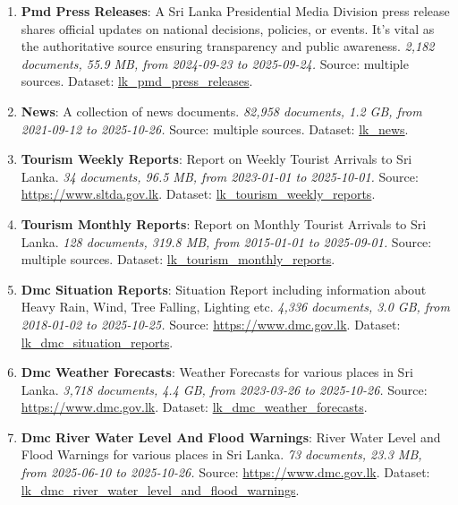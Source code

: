 \documentclass[10pt,a4paper]{article}%
\begin{document}
\begin{enumerate}
\item%
\textbf{Pmd Press Releases}: A Sri Lanka Presidential Media Division press release shares official updates on national decisions, policies, or events. It’s vital as the authoritative source ensuring transparency and public awareness.\textit{ 2,182 documents, 55.9 MB, from 2024{-}09{-}23 to 2025{-}09{-}24.} Source: multiple sources. Dataset: \href{https://github.com/nuuuwan/lk\_pmd/tree/data\_lk\_pmd\_press\_releases/data/lk\_pmd\_press\_releases}{lk\_pmd\_press\_releases}.%
\item%
\textbf{News}: A collection of news documents.\textit{ 82,958 documents, 1.2 GB, from 2021{-}09{-}12 to 2025{-}10{-}26.} Source: multiple sources. Dataset: \href{https://github.com/nuuuwan/lk\_news/tree/data/data/lk\_news}{lk\_news}.%
\item%
\textbf{Tourism Weekly Reports}: Report on Weekly Tourist Arrivals to Sri Lanka.\textit{ 34 documents, 96.5 MB, from 2023{-}01{-}01 to 2025{-}10{-}01.} Source: \href{https://www.sltda.gov.lk}{https://www.sltda.gov.lk}. Dataset: \href{https://github.com/nuuuwan/lk\_tourism/tree/data\_lk\_tourism\_weekly\_reports/data/lk\_tourism\_weekly\_reports}{lk\_tourism\_weekly\_reports}.%
\item%
\textbf{Tourism Monthly Reports}: Report on Monthly Tourist Arrivals to Sri Lanka.\textit{ 128 documents, 319.8 MB, from 2015{-}01{-}01 to 2025{-}09{-}01.} Source: multiple sources. Dataset: \href{https://github.com/nuuuwan/lk\_tourism/tree/data\_lk\_tourism\_monthly\_reports/data/lk\_tourism\_monthly\_reports}{lk\_tourism\_monthly\_reports}.%
\item%
\textbf{Dmc Situation Reports}: Situation Report including information about Heavy Rain, Wind, Tree Falling, Lighting etc.\textit{ 4,336 documents, 3.0 GB, from 2018{-}01{-}02 to 2025{-}10{-}25.} Source: \href{https://www.dmc.gov.lk}{https://www.dmc.gov.lk}. Dataset: \href{https://github.com/nuuuwan/lk\_dmc/tree/data\_lk\_dmc\_situation\_reports/data/lk\_dmc\_situation\_reports}{lk\_dmc\_situation\_reports}.%
\item%
\textbf{Dmc Weather Forecasts}: Weather Forecasts for various places in Sri Lanka.\textit{ 3,718 documents, 4.4 GB, from 2023{-}03{-}26 to 2025{-}10{-}26.} Source: \href{https://www.dmc.gov.lk}{https://www.dmc.gov.lk}. Dataset: \href{https://github.com/nuuuwan/lk\_dmc/tree/data\_lk\_dmc\_weather\_forecasts/data/lk\_dmc\_weather\_forecasts}{lk\_dmc\_weather\_forecasts}.%
\item%
\textbf{Dmc River Water Level And Flood Warnings}: River Water Level and Flood Warnings for various places in Sri Lanka.\textit{ 73 documents, 23.3 MB, from 2025{-}06{-}10 to 2025{-}10{-}26.} Source: \href{https://www.dmc.gov.lk}{https://www.dmc.gov.lk}. Dataset: \href{https://github.com/nuuuwan/lk\_dmc/tree/data\_lk\_dmc\_river\_water\_level\_and\_flood\_warnings/data/lk\_dmc\_river\_water\_level\_and\_flood\_warnings}{lk\_dmc\_river\_water\_level\_and\_flood\_warnings}.%

\end{enumerate}
\end{document}
